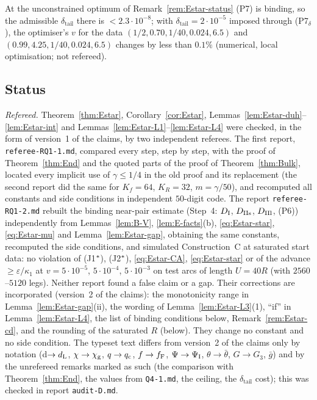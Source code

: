 At the unconstrained optimum of Remark~\ref{rem:Estar-status} \textup{(P7)} is binding, so the admissible $\delta_{\mathrm{tail}}$
there is $<2.3\cdot10^{-8}$; with $\delta_{\mathrm{tail}}=2\cdot10^{-5}$ imposed through \textup{(P7$_\delta$)}, the optimiser's $v$ for the data
$(1/2,0.70,1/40,0.024,6.5)$ and $(0.99,4.25,1/40,0.024,6.5)$ changes by less than $0.1\%$ (numerical, local optimisation; not
refereed).

\subsection{Status}

\begin{remark}[Status]\label{rem:Estar-status}
\emph{Refereed.} Theorem~\ref{thm:Estar}, Corollary~\ref{cor:Estar}, Lemmas~\ref{lem:Estar-duh}--\ref{lem:Estar-int} and
Lemmas~\ref{lem:Estar-L1}--\ref{lem:Estar-L4} were checked, in the form of version~1 of the claims, by two independent referees. The
first report, \texttt{referee-RQ1-1.md}, compared every step, step by step, with the proof of Theorem~\ref{thm:End} and the quoted parts of
the proof of Theorem~\ref{thm:Bulk}, located every implicit use of $\gamma\le1/4$ in the old proof and its replacement (the second report did the
same for $K_f=64$, $K_R=32$, $m=\gamma/50$), and recomputed all constants and side conditions in independent $50$-digit code. The report
\texttt{referee-RQ1-2.md} rebuilt the binding near-pair estimate (Step~4: $D_{\mathrm I}$, $D_{\mathrm{IIs}}$, $D_{\mathrm{IIl}}$, \textup{(P6)}) independently from
Lemmas~\ref{lem:B-V}, \ref{lem:E-facts}(b), \eqref{eq:Estar-star}, \eqref{eq:Estar-mu} and Lemma~\ref{lem:Estar-gap}, obtaining the
same constants, recomputed the side conditions, and simulated Construction~C at saturated start data: no violation of
(J1$^{*}$), (J2$^{*}$), \eqref{eq:Estar-CA}, \eqref{eq:Estar-star} or of the advance $\ge\varepsilon/\kappa_1$ at
$v=5\cdot10^{-5}$, $5\cdot10^{-4}$, $5\cdot10^{-3}$ on test arcs of length $U=40R$ (with $2560$--$5120$ legs). Neither report found a
false claim or a gap. Their corrections are incorporated (version~2 of the claims): the monotonicity range in
Lemma~\ref{lem:Estar-gap}(ii), the wording of Lemma~\ref{lem:Estar-L3}(1), ``if'' in Lemma~\ref{lem:Estar-L4}, the list of binding
conditions below, Remark~\ref{rem:Estar-cd}, and the rounding of the saturated $R$ (below). They change no constant and no
side condition. The typeset text differs from version~2 of the claims only by notation (d$\to d_{\mathrm L}$, $\chi\to\chi_{\mathrm g}$, $q\to q_{\mathrm c}$,
$f\to f_{\mathrm F}$, $\Psi\to\Psi_{\mathrm I}$, $\theta\to\bar\theta$, $G\to G_3$, $\bar g$) and by the unrefereed remarks marked as such (the comparison
with Theorem~\ref{thm:End}, the values from \texttt{Q4-1.md}, the ceiling, the $\delta_{\mathrm{tail}}$ cost); this was checked in
report \texttt{audit-D.md}.


\end{remark}
